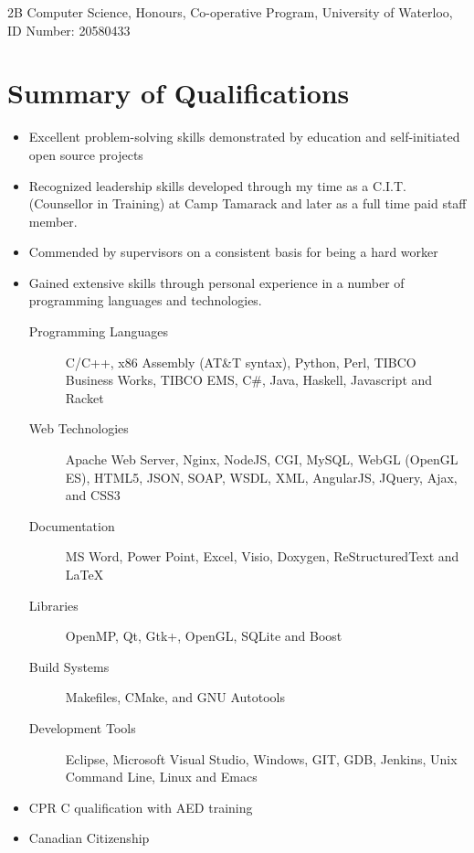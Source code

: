 \documentclass[11pt,letterpaper]{moderncv}
\newenvironment{coverletter}[2][Recruitment team]{%
  \recipient{#1}{#2}%
  \opening{Dear Sir or Madam,}%
  \closing{Sincerely,}%
  \enclosure{R\'esum\'e}%
  \makelettertitle%
}{%
  \makeletterclosing%
  \clearpage%
}
\begin{document}
\newif\ifincludeletter
\ifincludeletter
\begin{coverletter}{Company, Inc.\\123 somestreet\\some city}
  \lipsum[1-3]
\end{coverletter}
\fi

\makecvtitle

2B Computer Science, Honours, Co-operative Program, University of
Waterloo, ID Number: 20580433

\section{Summary of Qualifications}

\begin{itemize}
\item Excellent problem-solving skills demonstrated by education
  and self-initiated open source projects
\item Recognized leadership skills developed through my time as a
  C.I.T. (Counsellor in Training) at Camp Tamarack and later as a full
  time paid staff member.
\item Commended by supervisors on a consistent basis for being a hard
  worker
\item Gained extensive skills through personal experience in a number
  of programming languages and technologies.
  \begin{description}
  \item[Programming Languages] C/C++, x86 Assembly (AT\&T syntax),
    Python, Perl, TIBCO Business Works, TIBCO EMS, C\#, Java, Haskell,
    Javascript and Racket
  \item[Web Technologies] Apache Web Server, Nginx, NodeJS, CGI,
    MySQL, WebGL (OpenGL ES), HTML5, JSON, SOAP, WSDL, XML, AngularJS,
    JQuery, Ajax, and CSS3
  \item[Documentation] MS Word, Power Point, Excel, Visio, Doxygen,
    ReStructuredText and \LaTeX{}
  \item[Libraries] OpenMP, Qt, Gtk+, OpenGL, SQLite and Boost
  \item[Build Systems] Makefiles, CMake, and GNU Autotools
  \item[Development Tools] Eclipse, Microsoft Visual Studio, Windows,
    GIT, GDB, Jenkins, Unix Command Line, Linux and Emacs
  \end{description}
\item CPR C qualification with AED training
\item Canadian Citizenship
\end{itemize}
\end{document}
